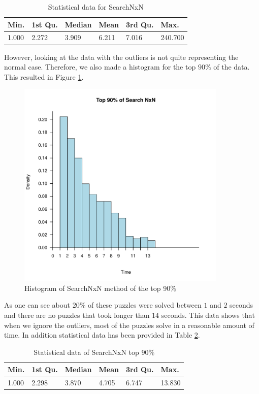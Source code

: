 \documentclass[letterpaper]{article}
\begin{document}
\begin{table}[h]
\begin{tabular}{|l|l|l|l|l|l|}
\hline
Min. & 1st Qu.  & Median & Mean & 3rd Qu. & Max.\\
\hline
1.000 & 2.272 & 3.909 & 6.211 & 7.016 & 240.700\\
\hline
\end{tabular}
\caption{Statistical data for SearchNxN}
\label{tab: SearchNxNTab1}
\end{table}

However, looking at the data with the outliers is not quite representing the normal case. Therefore, we also made a histogram for the top $90\%$ of the data. This resulted in Figure \ref{fig:search-time-complex-hist-90}.

\begin{figure}[h]
	\centering
	\includegraphics[width=100mm]{../stats/Top90SearchNxN.pdf}
	\caption{Histogram of SearchNxN method of the top 90\%}
	\label{fig:search-time-complex-hist-90}
\end{figure}

As one can see about $20\%$ of these puzzles were solved between $1$ and $2$ seconds and there are no puzzles that took longer than $14$ seconds. This data shows that when we ignore the outliers, most of the puzzles solve in a reasonable amount of time. In addition statistical data has been provided in Table \ref{tab:SearchNxNTab2}.

\begin{table}[h]
\begin{tabular}{|l|l|l|l|l|l|}
\hline
Min. & 1st Qu.  & Median & Mean & 3rd Qu. & Max.\\
\hline
1.000 & 2.298 & 3.870 & 4.705 & 6.747 & 13.830\\
\hline
\end{tabular}
\caption{Statistical data of SearchNxN top 90\%}
\label{tab:SearchNxNTab2}
\end{table}
\end{document}
